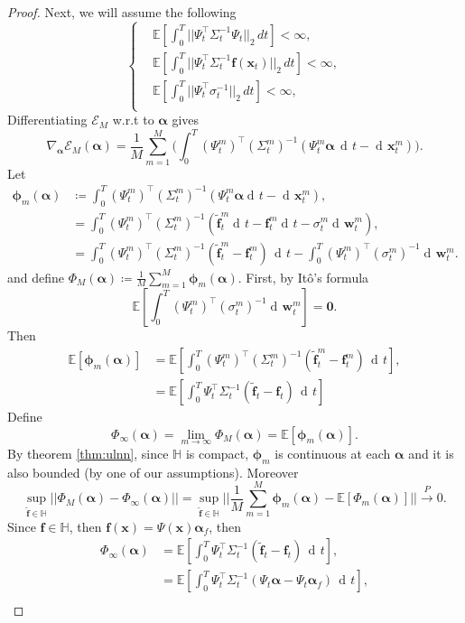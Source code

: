 \documentclass[11pt]{article} %
\def\rvw{{\mathbf{w}}}
\def\rvx{{\mathbf{x}}}
\def\vzero{{\bm{0}}}
\def\vf{{\bm{f}}}
\def\vx{{\bm{x}}}
\def\sH{{\mathbb{H}}}
\newcommand{\E}{\mathbb{E}}
\DeclareMathOperator{\dif}{d \!}        %
\newcommand{\dt}{\dif t}
\newcommand{\phivec}{\bm\phi}
\newcommand{\alphavec}{\bm\alpha}
\newcommand{\norm}[1]{||#1||}
\newcommand{\loss}{\mathcal{E}}
\begin{document}
\begin{proof}
\noindent Next, we will assume the following
\[
\begin{cases}
    &\E[\int_0^T\norm{\Psi_t^\intercal\Sigma_t^{-1}\Psi_t}_2 \, dt] < \infty, \\
    &\E[\int_0^T\norm{\Psi_t^\intercal\Sigma_t^{-1}\vf(\rvx_t)}_2 \, dt] < \infty, \\
    &\E[\int_0^T\norm{\Psi_t^\intercal\sigma_t^{-1}}_2 \, dt] < \infty, \\
\end{cases}
\]
Differentiating $\loss_M$ w.r.t to $\alphavec$ gives
\[
\nabla_{\alphavec}\loss_M(\alphavec) = \frac{1}{M}\sum_{m = 1}^M\big(\int_0^T(\Psi_t^m)^\intercal(\Sigma_t^m)^{-1}(\Psi_t^m\alphavec \, \dt - \dif\rvx_t^m)\big).
\]
Let
\[
\begin{aligned}
\phivec_m(\alphavec) &\coloneqq \int_0^T (\Psi_t^m)^\intercal(\Sigma_t^m)^{-1}(\Psi_t^m\alphavec\dt - \dif\rvx_t^m),\\
&= \int_0^T (\Psi_t^m)^\intercal(\Sigma_t^m)^{-1}(\tilde\vf_t^m\dt - \vf_t^m\dt - \sigma_t^m\dif\rvw_t^m), \\
&= \int_0^T (\Psi_t^m)^\intercal(\Sigma_t^m)^{-1}(\tilde\vf_t^m - \vf_t^m)\,\dt - \int_0^T(\Psi_t^m)^\intercal(\sigma_t^m)^{-1}\dif\rvw_t^m. 
\end{aligned}
\]
and define $\Phi_M(\alphavec) \coloneqq \frac{1}{M}\sum_{m = 1}^M\phivec_m(\alphavec)$.  First, by It\^{o}'s formula
\[
\E[\int_0^T(\Psi_t^m)^\intercal(\sigma_t^m)^{-1}\dif\rvw_t^m] = \vzero.
\]
Then
\[
\begin{aligned}
\E[\phivec_m(\alphavec)] &= \E[\int_0^T (\Psi_t^m)^\intercal(\Sigma_t^m)^{-1}(\tilde\vf_t^m - \vf_t^m)\,\dt], \\
&= \E[\int_0^T \Psi_t^\intercal\Sigma_t^{-1}(\tilde\vf_t - \vf_t)\,\dt]
\end{aligned}
\]
Define
\[
\Phi_{\infty}(\alphavec) = \lim_{m \rightarrow \infty}\Phi_M(\alphavec) = \E[\phivec_m(\alphavec)].
\]
By theorem \ref{thm:ulnn}, since $\sH$ is compact, $\phivec_m$ is continuous at each $\alphavec$ and it is also bounded (by one of our assumptions).  Moreover
\[
\sup_{\tilde\vf \in \sH}\norm{\Phi_M(\alphavec) - \Phi_{\infty}(\alphavec)} = \sup_{\tilde\vf \in \sH}\norm{\frac{1}{M}\sum_{m = 1}^M\phivec_m(\alphavec) - \E[\Phi_m(\alphavec)]} \xrightarrow{P} 0.
\]
Since $\vf \in \sH$, then $\vf(\vx) = \Psi(\vx)\alphavec_f$, then
\[
\begin{aligned}
\Phi_{\infty}(\alphavec) &= \E[\int_0^T \Psi_t^\intercal\Sigma_t^{-1}(\tilde\vf_t - \vf_t)\,\dt], \\
&= \E[\int_0^T \Psi_t^\intercal\Sigma_t^{-1}(\Psi_t\alphavec - \Psi_t\alphavec_f)\, \dt], \\

\end{aligned}\]
\end{proof}
\end{document}

